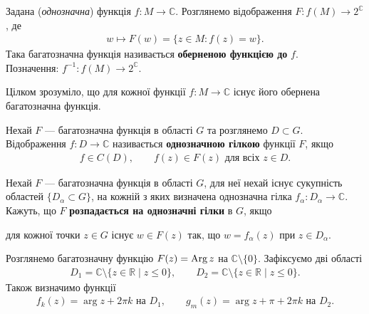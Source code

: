 \documentclass{math_library}
\begin{document}
\begin{definition}
Задана (\textit{однозначна}) функція $f \colon M \to \mathbb{C}$. Розглянемо відображення $F \colon f(M) \to 2^\mathbb{C}$, де
\begin{align*}
w \mapsto F(w) = \{ z \in M: f(z) = w \}.
\end{align*}
Така багатозначна функція називається \textbf{оберненою функцією до} $f$.\\
Позначення: $f^{-1} \colon f(M) \to 2^\mathbb{C}$.
\end{definition}

\begin{remark}
Цілком зрозуміло, що для кожної функції $f \colon M \to \mathbb{C}$ існує його обернена багатозначна функція.
\end{remark}

\begin{definition}
Нехай $F$ --- багатозначна функція в області $G$ та розглянемо $D \subset G$.\\
Відображення $f \colon D \to \mathbb{C}$ називається \textbf{однозначною гілкою} функції $F$, якщо
\begin{align*}
f \in C(D), \qquad f(z) \in F(z) \text{ для всіх $z \in D$}.
\end{align*}
\end{definition}

\begin{definition}
Нехай $F$ --- багатозначна функція в області $G$, для неї нехай існує сукупність областей $\{D_\alpha \subset G\}$, на кожній з яких визначена однозначна гілка $f_\alpha \colon D_\alpha \to \mathbb{C}$.\\
Кажуть, що $F$ \textbf{розпадається на однозначні гілки} в $G$, якщо
\begin{center}
для кожної точки $z \in G$ існує $w \in F(z)$ так, що $w = f_\alpha(z)$ при $z \in D_\alpha$.
\end{center}
\end{definition}

Розглянемо багатозначну функцію $F(z) = \operatorname{Arg} z$ на $\mathbb{C} \setminus \{0\}$. Зафіксуємо дві області
\begin{align*}
D_1 = \mathbb{C} \setminus \{ z \in \mathbb{R} \mid z \leq 0 \}, \qquad D_2 = \mathbb{C} \setminus \{ z \in \mathbb{R} \mid z \leq 0 \}.
\end{align*}
Також визначимо функції
\begin{align*}
f_k(z) = \arg z + 2 \pi k \text{ на } D_1, \qquad g_m(z) = \arg z + \pi + 2 \pi k \text{ на } D_2.
\end{align*}
\end{document}
